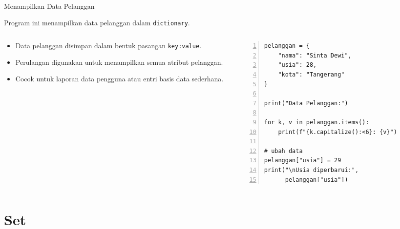 \documentclass[aspectratio=169, table]{beamer}
\begin{document}
\begin{frame}[fragile]{Menampilkan Data Pelanggan}
\vspace{20pt}

Program ini menampilkan data pelanggan dalam \texttt{dictionary}.

\begin{columns}[T]
  \begin{column}{0.4\textwidth}
    \begin{itemize}
      \item Data pelanggan disimpan dalam bentuk pasangan \texttt{key:value}.
      \item Perulangan digunakan untuk menampilkan semua atribut pelanggan.
      \item Cocok untuk laporan data pengguna atau entri basis data sederhana.
    \end{itemize}
  \end{column}

  \begin{column}{0.6\textwidth}
    \begin{lstlisting}[style=PythonStyle, numbers=left, firstnumber=1]
pelanggan = {
    "nama": "Sinta Dewi",
    "usia": 28,
    "kota": "Tangerang"
}

print("Data Pelanggan:")

for k, v in pelanggan.items():
    print(f"{k.capitalize():<6}: {v}")

# ubah data
pelanggan["usia"] = 29
print("\nUsia diperbarui:",
      pelanggan["usia"])
    \end{lstlisting}
  \end{column}
\end{columns}

\end{frame}


\section{Set}
\end{document}
